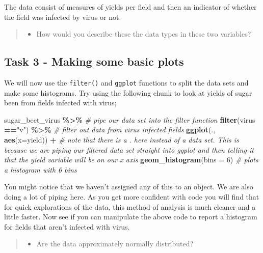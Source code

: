 \documentclass[
]{book}
\newenvironment{Shaded}{\begin{snugshade}}{\end{snugshade}}
\newcommand{\AttributeTok}[1]{\textcolor[rgb]{0.13,0.29,0.53}{#1}}
\newcommand{\CommentTok}[1]{\textcolor[rgb]{0.56,0.35,0.01}{\textit{#1}}}
\newcommand{\DecValTok}[1]{\textcolor[rgb]{0.00,0.00,0.81}{#1}}
\newcommand{\FunctionTok}[1]{\textcolor[rgb]{0.13,0.29,0.53}{\textbf{#1}}}
\newcommand{\NormalTok}[1]{#1}
\newcommand{\SpecialCharTok}[1]{\textcolor[rgb]{0.81,0.36,0.00}{\textbf{#1}}}
\newcommand{\StringTok}[1]{\textcolor[rgb]{0.31,0.60,0.02}{#1}}
\providecommand{\tightlist}{%
  \setlength{\itemsep}{0pt}\setlength{\parskip}{0pt}}
\begin{document}
The data consist of measures of yields per field and then an indicator of whether the field was infected by virus or not.

\begin{quote}
\begin{itemize}
\tightlist
\item
  How would you describe these the data types in these two variables?
\end{itemize}
\end{quote}

\hypertarget{task-3---making-some-basic-plots}{%
\subsection{Task 3 - Making some basic plots}\label{task-3---making-some-basic-plots}}

We will now use the \texttt{filter()} and \texttt{ggplot} functions to split the data sets and make some histograms. Try using the following chunk to look at yields of sugar been from fields infected with virus;

\begin{Shaded}
\begin{Highlighting}[]
\NormalTok{sugar\_beet\_virus }\SpecialCharTok{\%\textgreater{}\%} \CommentTok{\# pipe our data set into the filter function}
  \FunctionTok{filter}\NormalTok{(virus }\SpecialCharTok{==}\StringTok{"v"}\NormalTok{) }\SpecialCharTok{\%\textgreater{}\%} \CommentTok{\# filter out data from virus infected fields}
  \FunctionTok{ggplot}\NormalTok{(., }\FunctionTok{aes}\NormalTok{(}\AttributeTok{x=}\NormalTok{yield)) }\SpecialCharTok{+} \CommentTok{\# note that there is a . here instead of a data set. This is because we are piping our filtered data set straight into ggplot and then telling it that the yield variable will be on our x axis}
  \FunctionTok{geom\_histogram}\NormalTok{(}\AttributeTok{bins =} \DecValTok{6}\NormalTok{) }\CommentTok{\# plots a histogram with 6 bins}
\end{Highlighting}
\end{Shaded}

You might notice that we haven't assigned any of this to an object. We are also doing a lot of piping here. As you get more confident with code you will find that for quick explorations of the data, this method of analysis is much cleaner and a little faster. Now see if you can manipulate the above code to report a histogram for fields that aren't infected with virus.

\begin{quote}
\begin{itemize}
\tightlist
\item
  Are the data approximately normally distributed?
\end{itemize}
\end{quote}
\end{document}
